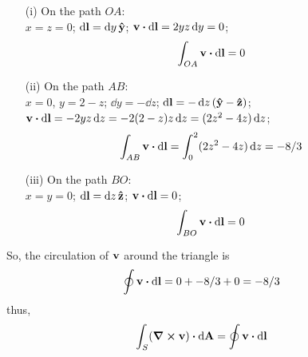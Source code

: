 \documentclass[../main.tex]{subfiles}
\begin{document}
\begin{enumerate}
    \item [(i)] On the path $OA$: \\
    $x = z = 0$; $\dd{\vb{l}} = \dd{y} \vu{y}$; $\vb{v} \vdot \dd{\vb{l}} = 2yz \dd{y} = 0$;
    \begin{align*}
        \int_{OA} \vb{v} \vdot \dd{\vb{l}} &= 0
    \end{align*}
    \item [(ii)] On the path $AB$: \\
    $x = 0$, $y = 2 - z$; $\dd{y} = -\dd{z}$; $\dd{\vb{l}} = -\dd{z}(\vu{y} - \vu{z})$;
    $\vb{v} \vdot \dd{\vb{l}} = -2yz \dd{z} = -2(2 - z)z \dd{z} = (2z^2 - 4z) \dd{z}$;
    \begin{align*}
        \int_{AB} \vb{v} \vdot \dd{\vb{l}} &= \int_0^2 (2z^2 - 4z) \dd{z} = -8/3
    \end{align*}
    \item [(iii)] On the path $BO$: \\
    $x = y = 0$; $\dd{\vb{l}} = \dd{z} \vu{z}$; $\vb{v} \vdot \dd{\vb{l}} = 0$;
    \begin{align*}
        \int_{BO} \vb{v} \vdot \dd{\vb{l}} &= 0
    \end{align*}
\end{enumerate}
So, the circulation of $\vb{v}$ around the triangle is
\begin{align*}
    \oint \vb{v} \vdot \dd{\vb{l}} &= 0 + -8/3 + 0 = -8/3
\end{align*}
thus,
\begin{align*}
    \int_S (\curl{\vb{v}}) \vdot \dd{\vb{A}} &= \oint \vb{v} \vdot \dd{\vb{l}}
\end{align*}
\end{document}

